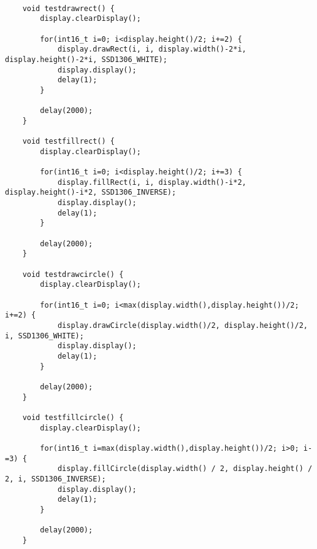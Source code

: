 \begin{code} [H]	
\begin{lstlisting} 

	void testdrawrect() {
		display.clearDisplay();
		
		for(int16_t i=0; i<display.height()/2; i+=2) {
			display.drawRect(i, i, display.width()-2*i, display.height()-2*i, SSD1306_WHITE);
			display.display();
			delay(1);
		}
		
		delay(2000);
	}
	
	void testfillrect() {
		display.clearDisplay();
		
		for(int16_t i=0; i<display.height()/2; i+=3) {
			display.fillRect(i, i, display.width()-i*2, display.height()-i*2, SSD1306_INVERSE);
			display.display();
			delay(1);
		}
		
		delay(2000);
	}
	
	void testdrawcircle() {
		display.clearDisplay();
		
		for(int16_t i=0; i<max(display.width(),display.height())/2; i+=2) {
			display.drawCircle(display.width()/2, display.height()/2, i, SSD1306_WHITE);
			display.display();
			delay(1);
		}
		
		delay(2000);
	}
	
	void testfillcircle() {
		display.clearDisplay();
		
		for(int16_t i=max(display.width(),display.height())/2; i>0; i-=3) {
			display.fillCircle(display.width() / 2, display.height() / 2, i, SSD1306_INVERSE);
			display.display();
			delay(1);
		}
		
		delay(2000);
	}

\end{lstlisting} 
\end{code}

